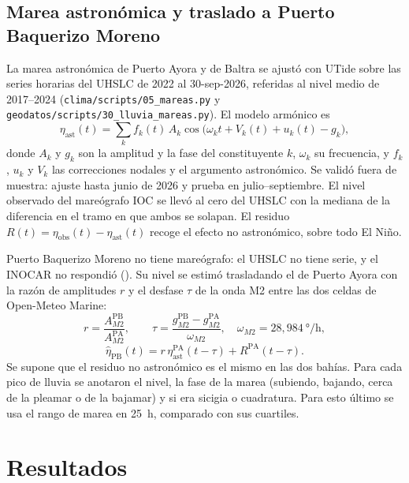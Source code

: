 \documentclass{sosg-informe}
\begin{document}
\subsection{Marea astronómica y traslado a Puerto Baquerizo Moreno}\label{sec:mareas}
La marea astronómica de Puerto Ayora y de Baltra se ajustó con UTide \citep{codiga2011} sobre las series horarias del UHSLC de 2022 al 30-sep-2026, referidas al nivel medio de 2017--2024 (\texttt{clima/scripts/05\_mareas.py} y \texttt{geodatos/scripts/30\_lluvia\_mareas.py}). El modelo armónico es
\begin{equation}
  \eta_{\text{ast}}(t) = \sum_{k} f_k(t)\, A_k \cos\!\bigl(\omega_k t + V_k(t) + u_k(t) - g_k\bigr),
\end{equation}
donde $A_k$ y $g_k$ son la amplitud y la fase del constituyente $k$, $\omega_k$ su frecuencia, y $f_k$, $u_k$ y $V_k$ las correcciones nodales y el argumento astronómico. Se validó fuera de muestra: ajuste hasta junio de 2026 y prueba en julio--septiembre. El nivel observado del mareógrafo IOC se llevó al cero del UHSLC con la mediana de la diferencia en el tramo en que ambos se solapan. El residuo $R(t) = \eta_{\text{obs}}(t) - \eta_{\text{ast}}(t)$ recoge el efecto no astronómico, sobre todo El Niño.

Puerto Baquerizo Moreno no tiene mareógrafo: el UHSLC no tiene serie, y el INOCAR no respondió (). Su nivel se estimó trasladando el de Puerto Ayora con la razón de amplitudes $r$ y el desfase $\tau$ de la onda M2 entre las dos celdas de Open-Meteo Marine:
\begin{equation}
  r = \frac{A_{M2}^{\text{PB}}}{A_{M2}^{\text{PA}}}, \qquad
  \tau = \frac{g_{M2}^{\text{PB}} - g_{M2}^{\text{PA}}}{\omega_{M2}}, \quad \omega_{M2} = 28{,}984\ \text{°/h},
\end{equation}
\begin{equation}
  \hat\eta_{\text{PB}}(t) = r\,\eta_{\text{ast}}^{\text{PA}}(t-\tau) + R^{\text{PA}}(t-\tau) .
\end{equation}
Se supone que el residuo no astronómico es el mismo en las dos bahías. Para cada pico de lluvia se anotaron el nivel, la fase de la marea (subiendo, bajando, cerca de la pleamar o de la bajamar) y si era sicigia o cuadratura. Para esto último se usa el rango de marea en 25~h, comparado con sus cuartiles.

\section{Resultados}
\end{document}
